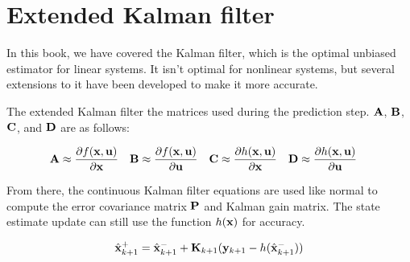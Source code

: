 \section{Extended Kalman filter}
\label{sec:ekf}

In this book, we have covered the Kalman filter, which is the optimal unbiased
estimator for linear \glspl{system}. It isn't optimal for nonlinear
\glspl{system}, but several extensions to it have been developed to make it more
accurate.

The extended Kalman filter  the matrices used
during the prediction step. $\mathbf{A}$, $\mathbf{B}$, $\mathbf{C}$, and $\mathbf{D}$ are
 as follows:

\begin{align*}
  \mathbf{A} &\approx
    \frac{\partial f(\mathbf{x}, \mathbf{u})}{\partial \mathbf{x}} &
  \mathbf{B} &\approx
    \frac{\partial f(\mathbf{x}, \mathbf{u})}{\partial \mathbf{u}} &
  \mathbf{C} &\approx
    \frac{\partial h(\mathbf{x}, \mathbf{u})}{\partial \mathbf{x}} &
  \mathbf{D} &\approx
    \frac{\partial h(\mathbf{x}, \mathbf{u})}{\partial \mathbf{u}}
\end{align*}

From there, the continuous Kalman filter equations are used like normal to
compute the error covariance matrix $\mathbf{P}$ and Kalman gain matrix. The
\gls{state} estimate update can still use the function $h(\mathbf{x})$ for
accuracy.

\begin{equation*}
  \hat{\mathbf{x}}_{k+1}^+ = \hat{\mathbf{x}}_{k+1}^- +
    \mathbf{K}_{k+1}(\mathbf{y}_{k+1} - h(\hat{\mathbf{x}}_{k+1}^-))
\end{equation*}
